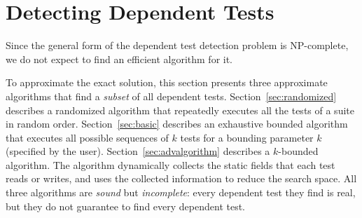 \section{Detecting Dependent Tests}
\label{sec:detecting}

\newcommand{\smalltrialnum}{10\xspace}
\newcommand{\mediumtrialnum}{100\xspace}
\newcommand{\trialnum}{1000\xspace}

\newcommand{\testlist}[0]{\ensuremath{T^k_i}}
\newcommand{\executeTestsInOrder}[1]{\result{#1}{\env_0}}

Since the general form of the dependent test detection problem is
NP-complete, we do not expect to find an efficient algorithm for it.

To approximate the exact solution, this section
presents three approximate algorithms that find a \textit{subset} of
all dependent tests.
Section~\ref{sec:randomized} describes a randomized algorithm
that repeatedly executes all the tests of a suite in random order.
Section~\ref{sec:basic} describes an exhaustive bounded algorithm that
executes all possible sequences of $k$ tests for a bounding parameter $k$
(specified by the user).
Section~\ref{sec:advalgorithm} describes a \dependenceaware{} $k$-bounded algorithm.
The \dependenceaware{} algorithm dynamically collects the
static fields that each test
reads or writes, and uses the collected information to reduce the search space.
All three algorithms are \textit{sound} but \textit{incomplete}:
every dependent test they find is real, but they do not
guarantee to find every dependent test.


